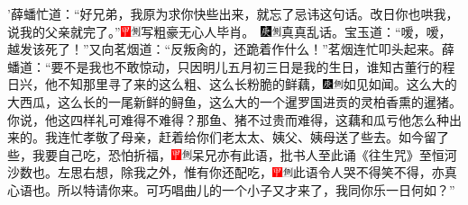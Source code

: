 '薛蟠忙道：``好兄弟，我原为求你快些出来，就忘了忌讳这句话。改日你也哄我，说我的父亲就完了。''{\includegraphics[width=3mm]{../Images/00002}\includegraphics[width=3mm]{../Images/00011}\footnotesize \kaishu 写粗豪无心人毕肖。　\includegraphics[width=3mm]{../Images/00004}\includegraphics[width=3mm]{../Images/00011}\footnotesize \kaishu 真真乱话。}宝玉道：``嗳，嗳，越发该死了！''又向茗烟道：``反叛肏的，还跪着作什么！''茗烟连忙叩头起来。薛蟠道：``要不是我也不敢惊动，只因明儿五月初三日是我的生日，谁知古董行的程日兴，他不知那里寻了来的这么粗、这么长粉脆的鲜藕，{\includegraphics[width=3mm]{../Images/00004}\includegraphics[width=3mm]{../Images/00011}\footnotesize \kaishu 如见如闻。}这么大的大西瓜，这么长的一尾新鲜的鲟鱼，这么大的一个暹罗国进贡的灵柏香熏的暹猪。你说，他这四样礼可难得不难得？那鱼、猪不过贵而难得，这藕和瓜亏他怎么种出来的。我连忙孝敬了母亲，赶着给你们老太太、姨父、姨母送了些去。如今留了些，我要自己吃，恐怕折福，{\includegraphics[width=3mm]{../Images/00002}\includegraphics[width=3mm]{../Images/00011}\footnotesize \kaishu 呆兄亦有此语，批书人至此诵《往生咒》至恒河沙数也。}左思右想，除我之外，惟有你还配吃，{\includegraphics[width=3mm]{../Images/00002}\includegraphics[width=3mm]{../Images/00011}\footnotesize \kaishu 此语令人哭不得笑不得，亦真心语也。}所以特请你来。可巧唱曲儿的一个小子又才来了，我同你乐一日何如？''


